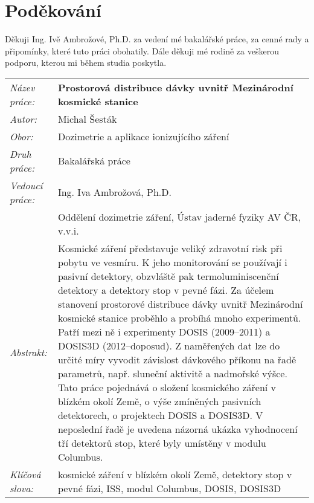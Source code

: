 \section*{Poděkování}
Děkuji Ing. Ivě Ambrožové, Ph.D. za vedení mé bakalářské práce, za cenné rady a připomínky, které tuto práci obohatily. Dále děkuji mé rodině za veškerou podporu, kterou mi během studia poskytla.
\newpage
\begin{tabularx}{\textwidth}{>{\itshape}l X}
  Název práce: & \textbf{Prostorová distribuce dávky uvnitř Mezinárodní kosmické stanice}\\
  Autor: & Michal Šesták\\
  Obor: & Dozimetrie a aplikace ionizujícího záření\\
  Druh práce: & Bakalářská práce\\
  Vedoucí práce: & Ing. Iva Ambrožová, Ph.D.\\ 
               & Oddělení dozimetrie záření, Ústav jaderné fyziky AV ČR, v.v.i.\\
  Abstrakt: & Kosmické záření představuje veliký zdravotní risk při pobytu ve vesmíru. K jeho monitorování se používají i pasivní detektory, obzvláště pak termoluminiscenční detektory a detektory stop v pevné fázi. Za účelem stanovení prostorové distribuce dávky uvnitř Mezinárodní kosmické stanice proběhlo a probíhá mnoho experimentů. Patří mezi ně i experimenty DOSIS (2009--2011) a DOSIS3D (2012--doposud). Z naměřených dat lze do určité míry vyvodit závislost dávkového příkonu na řadě parametrů, např. sluneční aktivitě a nadmořské výšce. 
  Tato práce pojednává o složení kosmického záření v blízkém okolí Země, o výše zmíněných pasivních detektorech, o projektech DOSIS a DOSIS3D. V neposlední řadě je uvedena názorná ukázka vyhodnocení tří detektorů stop, které byly umístěny v modulu Columbus. \\
  Klíčová slova: & kosmické záření v blízkém okolí Země, detektory stop v pevné fázi, ISS, modul Columbus, DOSIS, DOSIS3D
\end{tabularx}
\newpage
